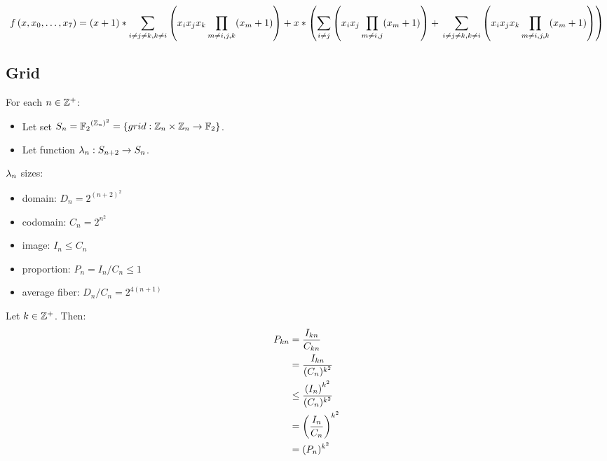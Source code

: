 \documentclass[letterpaper, 14pt]{extarticle}
\begin{document}
\begin{flushleft}
\begin{remark}
\begin{dmath*}
\lp = (\cell + 1) *
\sum_{i \ne j \ne k, k \ne i}\parentheses
{\cell_i \cell_j \cell_k
\prod_{m \ne i, j, k}(\cell_m + 1)} + \\
\cell * \parentheses
{\sum_{i \ne j}\parentheses
{\cell_i \cell_j \prod_{m \ne i, j}(\cell_m + 1)} + \\
\sum_{i \ne j \ne k, k \ne i}\parentheses
{\cell_i \cell_j \cell_k
\prod_{m \ne i, j, k}(\cell_m + 1)}}
\end{dmath*}
\end{remark}


\subsection{Grid}

\begin{definition}
For each $n \in \mathbb{Z}^+$:
\begin{itemize}
\item Let set $S_{n} = {\mathbb{F}_2}^{{\left( \mathbb{Z}_n \right)}^2} =
  \{grid: \mathbb{Z}_n \times \mathbb{Z}_n \to \mathbb{F}_2\}$.
\item Let function $\lambda_{n}: S_{n+2} \to S_{n}$.
\end{itemize}
\end{definition}

\begin{remark}
$\lambda_{n}$ sizes:
\begin{itemize}
\item domain: $D_n = 2^{(n+2)^2}$
\item codomain: $C_n = 2^{n^2}$
\item image: $I_n \le C_n$
\item proportion: $P_n = I_n / C_n \le 1$
\item average fiber: $D_n / C_n = 2^{4(n+1)}$
\end{itemize}
\end{remark}

\begin{remark}
Let $k \in \mathbb{Z}^+$. Then:
\begin{align}
P_{k n} & = \frac{I_{k n}}{C_{k n}} \\
& = \frac{I_{k n}}{(C_n)^{k^2}} \\
& \le \frac{{(I_n)}^{k^2}}{(C_n)^{k^2}} \\
& = \left( \frac{I_n}{C_n} \right)^{k^2} \\
& = (P_n)^{k^2}
\end{align}
\end{remark}


\end{flushleft}
\end{document}
